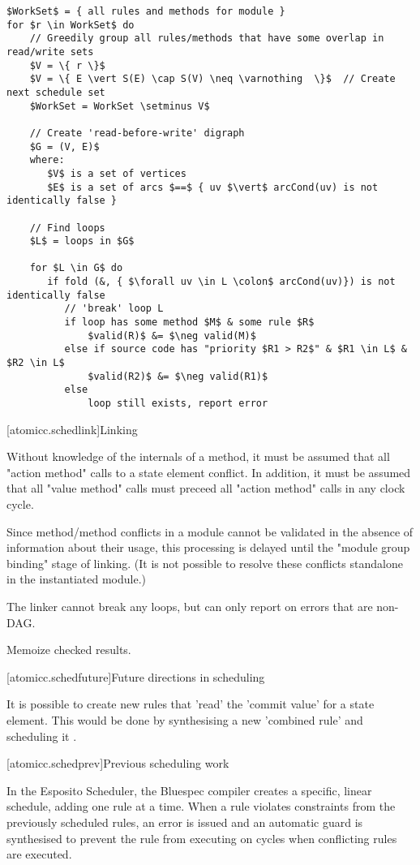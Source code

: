 \begin{lstlisting}[mathescape=true]
$WorkSet$ = { all rules and methods for module }
for $r \in WorkSet$ do
    // Greedily group all rules/methods that have some overlap in read/write sets
    $V = \{ r \}$
    $V = \{ E \vert S(E) \cap S(V) \neq \varnothing  \}$  // Create next schedule set
    $WorkSet = WorkSet \setminus V$

    // Create 'read-before-write' digraph
    $G = (V, E)$
    where: 
       $V$ is a set of vertices
       $E$ is a set of arcs $==$ { uv $\vert$ arcCond(uv) is not identically false }

    // Find loops
    $L$ = loops in $G$

    for $L \in G$ do
       if fold (&, { $\forall uv \in L \colon$ arcCond(uv)}) is not identically false
          // 'break' loop L
          if loop has some method $M$ & some rule $R$
              $valid(R)$ &= $\neg valid(M)$
          else if source code has "priority $R1 > R2$" & $R1 \in L$ & $R2 \in L$
              $valid(R2)$ &= $\neg valid(R1)$
          else
              loop still exists, report error
\end{lstlisting}

[atomicc.schedlink]{Linking}

Without knowledge of the internals of a method, it must be assumed that all "action method"
calls to a state element conflict.  In addition, it must be assumed that all "value method" calls
must preceed all "action method" calls in any clock cycle.

Since method/method conflicts in a module cannot be validated in the absence of
information about their usage, this processing is delayed until the "module group binding"
stage of linking.
(It is not possible to resolve these conflicts standalone in the instantiated module.)

The linker cannot break any loops, but can only report on errors that are non-DAG.

Memoize checked results.

[atomicc.schedfuture]{Future directions in scheduling}

It is possible to create new rules that 'read' the 'commit value' for a state element.
This would be done by synthesising a new 'combined rule' and scheduling it \cite{Rosenband:Thesis}.

[atomicc.schedprev]{Previous scheduling work}

In the Esposito Scheduler\cite{Esposito:Patent},
the Bluespec compiler creates a specific, linear schedule, adding
one rule at a time.  When a rule violates constraints from the previously scheduled
rules, an error is issued and an automatic guard is synthesised to prevent the
rule from executing on cycles when conflicting rules are executed.

